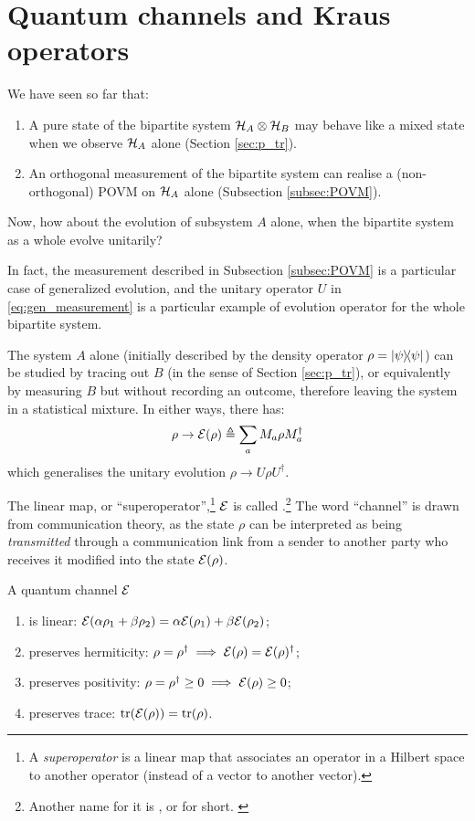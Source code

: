 \section{Quantum channels and Kraus operators}

We have seen so far that:
\begin{enumerate}
\item
  A pure state of the bipartite system $\mathcal{H}_A\otimes\mathcal{H}_B$
  may behave like a mixed state when we observe $\mathcal{H}_A$ alone
  (Section \ref{sec:p_tr}).
\item
  An orthogonal measurement of the bipartite system can realise a
  (non-orthogonal) POVM on $\mathcal{H}_A$ alone (Subsection \ref{subsec:POVM}).
\end{enumerate}
Now, how about the evolution of subsystem $A$ alone,
when the bipartite system as a whole evolve unitarily?

In fact, the measurement described in Subsection \ref{subsec:POVM}
is a particular case of generalized evolution, and the unitary operator $U$
in \eqref{eq:gen_measurement} is a particular example of
evolution operator for the whole bipartite system.

The system $A$ alone
(initially described by the density operator $\rho=\ketbra{\psi}$)
can be studied by tracing out $B$
(in the sense of Section \ref{sec:p_tr}),
or equivalently by measuring $B$
but without recording an outcome, therefore leaving the system
in a statistical mixture.
In either ways, there has:
\begin{equation}\label{eq:channel}
  \rho \rightarrow \mathcal{E}(\rho) \triangleq \sum_a M_a \rho M_a^{\dagger}
\end{equation}
which generalises the unitary evolution $\rho \rightarrow U \rho U^{\dagger}$.

The linear map, or ``superoperator'',\footnote{
  A \emph{superoperator} is a linear map that associates an operator
  in a Hilbert space to another operator (instead of a vector to another vector).
}
$\mathcal{E}$
is called .\footnote{
  Another name for it is
  ,
  or  for short. \parencite[\S 3.2]{PreskillNotes}
}
The word ``channel'' is drawn from communication theory,
as the state $\rho$ can be interpreted as being \emph{transmitted}
through
a communication link from a sender to another party
who receives it modified into the state $\mathcal{E}(\rho)$.

A quantum channel $\mathcal{E}$
\begin{enumerate}
  \item is linear:
    $\mathcal{E}(\alpha\rho_1+\beta\rho_2) = \alpha\mathcal{E}(\rho_1) + \beta\mathcal{E}(\rho_2)$;
  \item preserves hermiticity:
    $\rho = \rho^{\dagger} \implies \mathcal{E}(\rho) = \mathcal{E}(\rho)^{\dagger}$;
  \item preserves positivity:
    $\rho = \rho^{\dagger} \geq 0 \implies \mathcal{E}(\rho) \geq 0$;
  \item preserves trace:
    $\tr(\mathcal{E}(\rho)) = \tr(\rho)$.  
\end{enumerate}

